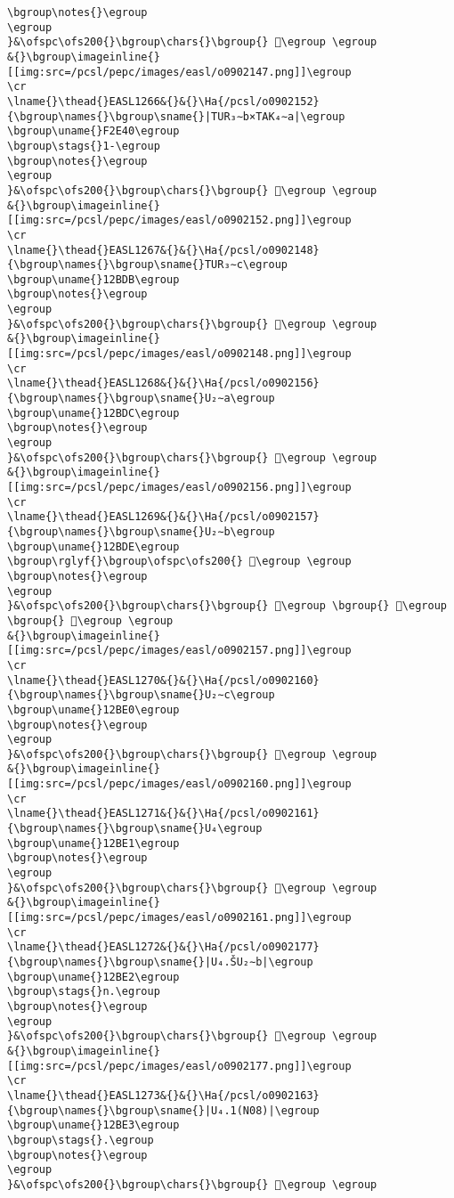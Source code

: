 \begin{verbatim}
\bgroup\notes{}\egroup
\egroup
}&\ofspc\ofs200{}\bgroup\chars{}\bgroup{} 𒯚\egroup \egroup
&{}\bgroup\imageinline{}[[img:src=/pcsl/pepc/images/easl/o0902147.png]]\egroup
\cr
\lname{}\thead{}EASL1266&{}&{}\Ha{/pcsl/o0902152}{\bgroup\names{}\bgroup\sname{}|TUR₃∼b×TAK₄∼a|\egroup
\bgroup\uname{}F2E40\egroup
\bgroup\stags{}1-\egroup
\bgroup\notes{}\egroup
\egroup
}&\ofspc\ofs200{}\bgroup\chars{}\bgroup{} 󲹀\egroup \egroup
&{}\bgroup\imageinline{}[[img:src=/pcsl/pepc/images/easl/o0902152.png]]\egroup
\cr
\lname{}\thead{}EASL1267&{}&{}\Ha{/pcsl/o0902148}{\bgroup\names{}\bgroup\sname{}TUR₃∼c\egroup
\bgroup\uname{}12BDB\egroup
\bgroup\notes{}\egroup
\egroup
}&\ofspc\ofs200{}\bgroup\chars{}\bgroup{} 𒯛\egroup \egroup
&{}\bgroup\imageinline{}[[img:src=/pcsl/pepc/images/easl/o0902148.png]]\egroup
\cr
\lname{}\thead{}EASL1268&{}&{}\Ha{/pcsl/o0902156}{\bgroup\names{}\bgroup\sname{}U₂∼a\egroup
\bgroup\uname{}12BDC\egroup
\bgroup\notes{}\egroup
\egroup
}&\ofspc\ofs200{}\bgroup\chars{}\bgroup{} 𒯜\egroup \egroup
&{}\bgroup\imageinline{}[[img:src=/pcsl/pepc/images/easl/o0902156.png]]\egroup
\cr
\lname{}\thead{}EASL1269&{}&{}\Ha{/pcsl/o0902157}{\bgroup\names{}\bgroup\sname{}U₂∼b\egroup
\bgroup\uname{}12BDE\egroup
\bgroup\rglyf{}\bgroup\ofspc\ofs200{} 𒯞\egroup \egroup
\bgroup\notes{}\egroup
\egroup
}&\ofspc\ofs200{}\bgroup\chars{}\bgroup{} 𒯝\egroup \bgroup{} 𒯞\egroup \bgroup{} 𒯟\egroup \egroup
&{}\bgroup\imageinline{}[[img:src=/pcsl/pepc/images/easl/o0902157.png]]\egroup
\cr
\lname{}\thead{}EASL1270&{}&{}\Ha{/pcsl/o0902160}{\bgroup\names{}\bgroup\sname{}U₂∼c\egroup
\bgroup\uname{}12BE0\egroup
\bgroup\notes{}\egroup
\egroup
}&\ofspc\ofs200{}\bgroup\chars{}\bgroup{} 𒯠\egroup \egroup
&{}\bgroup\imageinline{}[[img:src=/pcsl/pepc/images/easl/o0902160.png]]\egroup
\cr
\lname{}\thead{}EASL1271&{}&{}\Ha{/pcsl/o0902161}{\bgroup\names{}\bgroup\sname{}U₄\egroup
\bgroup\uname{}12BE1\egroup
\bgroup\notes{}\egroup
\egroup
}&\ofspc\ofs200{}\bgroup\chars{}\bgroup{} 𒯡\egroup \egroup
&{}\bgroup\imageinline{}[[img:src=/pcsl/pepc/images/easl/o0902161.png]]\egroup
\cr
\lname{}\thead{}EASL1272&{}&{}\Ha{/pcsl/o0902177}{\bgroup\names{}\bgroup\sname{}|U₄.ŠU₂∼b|\egroup
\bgroup\uname{}12BE2\egroup
\bgroup\stags{}n.\egroup
\bgroup\notes{}\egroup
\egroup
}&\ofspc\ofs200{}\bgroup\chars{}\bgroup{} 𒯢\egroup \egroup
&{}\bgroup\imageinline{}[[img:src=/pcsl/pepc/images/easl/o0902177.png]]\egroup
\cr
\lname{}\thead{}EASL1273&{}&{}\Ha{/pcsl/o0902163}{\bgroup\names{}\bgroup\sname{}|U₄.1(N08)|\egroup
\bgroup\uname{}12BE3\egroup
\bgroup\stags{}.\egroup
\bgroup\notes{}\egroup
\egroup
}&\ofspc\ofs200{}\bgroup\chars{}\bgroup{} 𒯣\egroup \egroup

\end{verbatim}
